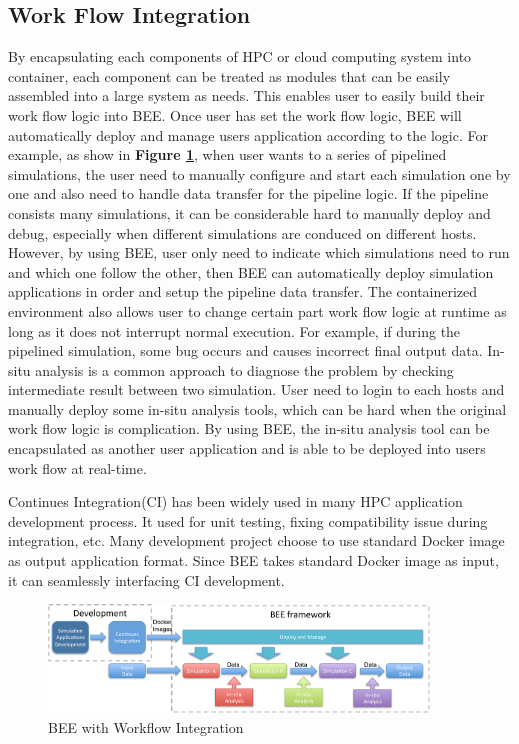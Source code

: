 \subsection{Work Flow Integration}
By encapsulating each components of HPC or cloud computing system into container, each component can be treated as modules that can be easily assembled into a large system as needs. This enables user to easily build their work flow logic into BEE. Once user has set the work flow logic, BEE will automatically deploy and manage users application according to the logic. For example, as show in \textbf{Figure \ref{workflow}}, when user wants to a series of pipelined simulations, the user need to manually configure and start each simulation one by one and also need to handle data transfer for the pipeline logic. If the pipeline consists many simulations, it can be considerable hard to manually deploy and debug, especially when different simulations are conduced on different hosts. However, by using BEE, user only need to indicate which simulations need to run and which one follow the other, then BEE can automatically deploy simulation applications in order and setup the pipeline data transfer. The containerized environment also allows user to change certain part work flow logic at runtime as long as it does not interrupt normal execution. For example, if during the pipelined simulation, some bug occurs and causes incorrect final output data. In-situ analysis is a common approach to diagnose the problem by checking intermediate result between two simulation. User need to login to each hosts and manually deploy some in-situ analysis tools, which can be hard when the original work flow logic is complication. By using BEE, the in-situ analysis tool can be encapsulated as another user application and is able to be deployed into users work flow at real-time.

Continues Integration(CI) \cite{fowler2006continuous} has been widely used in many HPC application development process. It used for unit testing, fixing compatibility issue during integration, etc. Many development project choose to use standard Docker image as output application format. Since BEE takes standard Docker image as input, it can seamlessly interfacing CI development.
\begin{figure}[h]
    \centering
    \caption{BEE with Workflow Integration}
    \label{workflow}
    \includegraphics[width=0.9\textwidth]{figures/workflow.pdf}
\end{figure}


